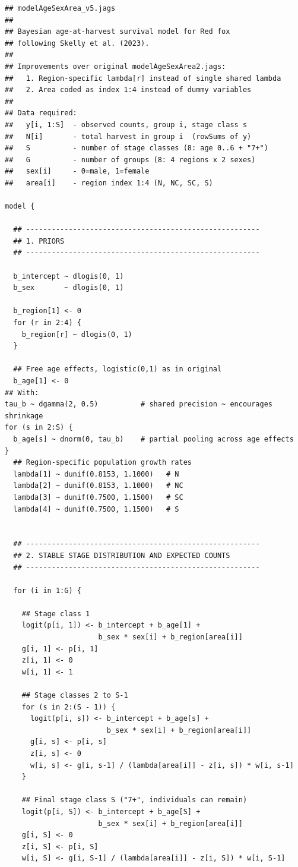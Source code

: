 \documentclass[12pt,a4paper,final,abstract=true,headings=small]{scrartcl}
\begin{document}
\begin{lstlisting}[language=JAGS]
## modelAgeSexArea_v5.jags
##
## Bayesian age-at-harvest survival model for Red fox
## following Skelly et al. (2023).
##
## Improvements over original modelAgeSexArea2.jags:
##   1. Region-specific lambda[r] instead of single shared lambda
##   2. Area coded as index 1:4 instead of dummy variables
##
## Data required:
##   y[i, 1:S]  - observed counts, group i, stage class s
##   N[i]       - total harvest in group i  (rowSums of y)
##   S          - number of stage classes (8: age 0..6 + "7+")
##   G          - number of groups (8: 4 regions x 2 sexes)
##   sex[i]     - 0=male, 1=female
##   area[i]    - region index 1:4 (N, NC, SC, S)

model {

  ## -------------------------------------------------------
  ## 1. PRIORS
  ## -------------------------------------------------------

  b_intercept ~ dlogis(0, 1)
  b_sex       ~ dlogis(0, 1)

  b_region[1] <- 0
  for (r in 2:4) {
    b_region[r] ~ dlogis(0, 1)
  }

  ## Free age effects, logistic(0,1) as in original
  b_age[1] <- 0
## With:
tau_b ~ dgamma(2, 0.5)          # shared precision ~ encourages shrinkage
for (s in 2:S) {
  b_age[s] ~ dnorm(0, tau_b)    # partial pooling across age effects
}
  ## Region-specific population growth rates
  lambda[1] ~ dunif(0.8153, 1.1000)   # N
  lambda[2] ~ dunif(0.8153, 1.1000)   # NC
  lambda[3] ~ dunif(0.7500, 1.1500)   # SC
  lambda[4] ~ dunif(0.7500, 1.1500)   # S


  ## -------------------------------------------------------
  ## 2. STABLE STAGE DISTRIBUTION AND EXPECTED COUNTS
  ## -------------------------------------------------------

  for (i in 1:G) {

    ## Stage class 1
    logit(p[i, 1]) <- b_intercept + b_age[1] +
                      b_sex * sex[i] + b_region[area[i]]
    g[i, 1] <- p[i, 1]
    z[i, 1] <- 0
    w[i, 1] <- 1

    ## Stage classes 2 to S-1
    for (s in 2:(S - 1)) {
      logit(p[i, s]) <- b_intercept + b_age[s] +
                        b_sex * sex[i] + b_region[area[i]]
      g[i, s] <- p[i, s]
      z[i, s] <- 0
      w[i, s] <- g[i, s-1] / (lambda[area[i]] - z[i, s]) * w[i, s-1]
    }

    ## Final stage class S ("7+", individuals can remain)
    logit(p[i, S]) <- b_intercept + b_age[S] +
                      b_sex * sex[i] + b_region[area[i]]
    g[i, S] <- 0
    z[i, S] <- p[i, S]
    w[i, S] <- g[i, S-1] / (lambda[area[i]] - z[i, S]) * w[i, S-1]


\end{lstlisting}
\end{document}
